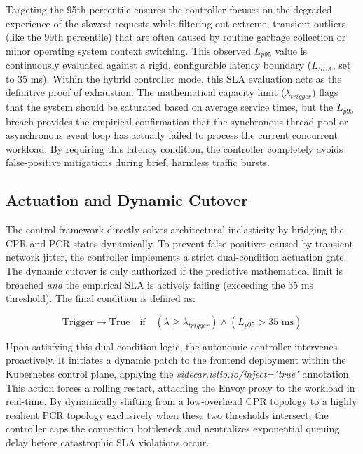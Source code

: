 \documentclass{ieeeaccess}
\begin{document}
Targeting the 95th percentile ensures the controller focuses on the degraded experience of the slowest requests while filtering out extreme, transient outliers (like the 99th percentile) that are often caused by routine garbage collection or minor operating system context switching. This observed $L_{p95}$ value is continuously evaluated against a rigid, configurable latency boundary ($L_{SLA}$, set to $35$ ms). Within the hybrid controller mode, this SLA evaluation acts as the definitive proof of exhaustion. The mathematical capacity limit ($\lambda_{trigger}$) flags that the system should be saturated based on average service times, but the $L_{p95}$ breach provides the empirical confirmation that the synchronous thread pool or asynchronous event loop has actually failed to process the current concurrent workload. By requiring this latency condition, the controller completely avoids false-positive mitigations during brief, harmless traffic bursts.



\subsection{Actuation and Dynamic Cutover}
\label{sec3.3}

The control framework directly solves architectural inelasticity by bridging the CPR and PCR states dynamically. To prevent false positives caused by transient network jitter, the controller implements a strict dual-condition actuation gate. The dynamic cutover is only authorized if the predictive mathematical limit is breached \textit{and} the empirical SLA is actively failing (exceeding the $35$ ms threshold). The final condition is defined as:

\begin{equation}
	\text{Trigger} \rightarrow \text{True} \quad \text{if} \quad (\lambda \ge \lambda_{trigger}) \land (L_{p95} > 35\text{ ms})
\end{equation}

Upon satisfying this dual-condition logic, the autonomic controller intervenes proactively. It initiates a dynamic patch to the frontend deployment within the Kubernetes control plane, applying the \textit{sidecar.istio.io/inject="true"} annotation. This action forces a rolling restart, attaching the Envoy proxy to the workload in real-time. By dynamically shifting from a low-overhead CPR topology to a highly resilient PCR topology exclusively when these two thresholds intersect, the controller caps the connection bottleneck and neutralizes exponential queuing delay before catastrophic SLA violations occur.
\end{document}
